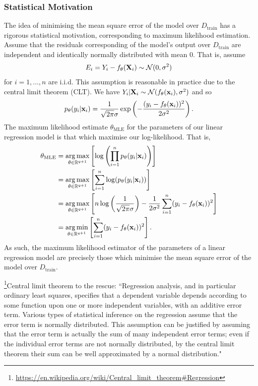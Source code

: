 \documentclass[11pt]{article}
\begin{document}
\subsubsection{Statistical Motivation}

The idea of minimising the mean square error of the model over $D_{\text{train}}$ has a rigorous statistical motivation, corresponding to maximum likelihood estimation. Assume that the residuals corresponding of the model's output over $D_{\text{train}}$ are independent and identically normally distributed with mean 0. That is, assume
$$
E_i
=
Y_i-f_{\theta}(\mathbf{X}_i)\sim\mathcal{N}(0, \sigma^2)
$$
for $i=1,\dots,n$ are i.i.d. This assumption is reasonable in practice due to the central limit theorem (CLT). We have $Y_i|\mathbf{X}_i\sim\mathcal{N}(f_{\theta}(\mathbf{x}_i), \sigma^2)$ and so
$$
p_{\theta}(y_i|\mathbf{x}_i)=\frac{1}{\sqrt{2\pi}\sigma}\exp\left(-\frac{(y_i-f_{\theta}(\mathbf{x}_i))^2}{2\sigma^2}\right).
$$
The maximum likelihood estimate $\theta_{\text{MLE}}$ for the parameters of our linear regression model is that which maximise our log-likelihood. That is,
\begin{align*}
    \theta_{\text{MLE}}
    &=
    \operatorname*{arg\,max}_{\theta\in\mathbb{R}^{q+1}}\left[\log\left(\prod_{i=1}^n p_{\theta}(y_i|\mathbf{x}_i)\right)\right]\\
    &=
    \operatorname*{arg\,max}_{\theta\in\mathbb{R}^{q+1}}\left[\sum_{i=1}^n\log(p_{\theta}(y_i|\mathbf{x}_i))\right]\\
    &=
    \operatorname*{arg\,max}_{\theta\in\mathbb{R}^{q+1}}\left[n\log\left(\frac{1}{\sqrt{2\pi}\sigma}\right)-\frac{1}{2\sigma^2}\sum_{i=1}^n(y_i-f_{\theta}(\mathbf{x}_i))^2\right]\\
    &=
    \operatorname*{arg\,min}_{\theta\in\mathbb{R}^{q+1}}\left[\sum_{i=1}^n(y_i-f_{\theta}(\mathbf{x}_i))^2\right].
\end{align*}
As such, the maximum likelihood estimator of the parameters of a linear regression model are precisely those which minimise the mean square error of the model over $D_{\text{train}}$.

\begin{tcolorbox}[title={\centering\textbf{Are residuals really normally distributed?}}, colback=myLightBlue, colbacktitle=myDarkBlue, colframe=myDarkBlue, coltitle=white]
    \footnote{\url{https://en.wikipedia.org/wiki/Central\_limit\_theorem\#Regression}}Central limit theorem to the rescue: ``Regression analysis, and in particular ordinary least squares, specifies that a dependent variable depends according to some function upon one or more independent variables, with an additive error term. Various types of statistical inference on the regression assume that the error term is normally distributed. This assumption can be justified by assuming that the error term is actually the sum of many independent error terms; even if the individual error terms are not normally distributed, by the central limit theorem their sum can be well approximated by a normal distribution."
\end{tcolorbox}
\end{document}
